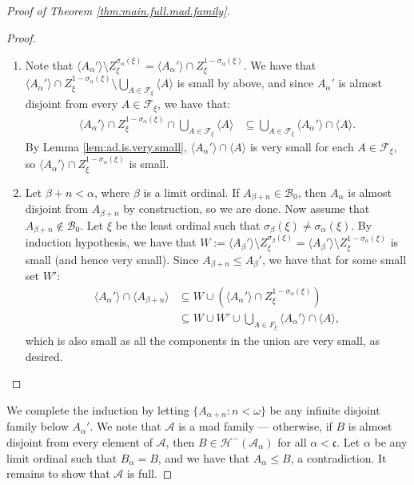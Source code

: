\documentclass[10pt,a4paper]{amsart}
\theoremstyle{plain}
\numberwithin{equation}{section}
\theoremstyle{definition}
\renewcommand{\c}[1]{\langle #1 \rangle}
\newcommand{\F}{\cal{F}}
\newcommand{\cal}{\mathcal}
\renewcommand{\frak}{\mathfrak}
\newcommand{\A}{\cal{A}}
\newcommand{\B}{\cal{B}}
\renewcommand{\H}{\cal{H}}
\newenvironment{midproof}[1][Proof]
  {\begin{proof}[#1]\renewcommand{\qedsymbol}{$\blacksquare$}}
  {\end{proof}}
\begin{document}
\begin{proof}[Proof of Theorem \ref{thm:main.full.mad.family}]
    \begin{midproof}
        \hfill
        \begin{enumerate}
            \item Note that $\c{A_\alpha'} \setminus Z_\xi^{\sigma_\alpha(\xi)} = \c{A_\alpha'} \cap Z_\xi^{1-\sigma_\alpha(\xi)}$. We have that $\c{A_\alpha'} \cap Z_\xi^{1 - \sigma_\alpha(\xi)} \setminus \bigcup_{A \in \F_\xi} \c{A}$ is small by above, and since $A_\alpha'$ is almost disjoint from every $A \in \F_\xi$, we have that:
            \begin{align*}
                \c{A_\alpha'} \cap Z_\xi^{1 - \sigma_\alpha(\xi)} \cap \bigcup_{A \in \F_\xi} \c{A} &\subseteq \bigcup_{A \in \F_\xi} \c{A_\alpha'} \cap \c{A}.
            \end{align*}
            By Lemma \ref{lem:ad.is.very.small}, $\c{A_\alpha'} \cap \c{A}$ is very small for each $A \in \F_\xi$, so $\c{A_\alpha'} \cap Z_\xi^{1-\sigma_\alpha(\xi)}$ is small. 

            \item Let $\beta + n < \alpha$, where $\beta$ is a limit ordinal. If $A_{\beta+n} \in \B_0$, then $A_\alpha$ is almost disjoint from $A_{\beta+n}$ by construction, so we are done. Now assume that $A_{\beta+n} \notin \B_0$. Let $\xi$ be the least ordinal such that $\sigma_\beta(\xi) \neq \sigma_\alpha(\xi)$. By induction hypothesis, we have that $W := \c{A_\beta'} \setminus Z_\xi^{\sigma_\beta(\xi)} = \c{A_\beta'} \setminus Z_\xi^{1-\sigma_\alpha(\xi)}$ is small (and hence very small). Since $A_{\beta+n} \leq A_\beta'$, we have that for some small set $W'$:
            \begin{align*}
                \c{A_\alpha'} \cap \c{A_{\beta+n}} &\subseteq W \cup (\c{A_\alpha'} \cap Z_\xi^{1-\sigma_\alpha(\xi)}) \\
                &\subseteq W \cup W' \cup \bigcup_{A \in F_\xi} \c{A_\alpha'} \cap \c{A},
            \end{align*}
            which is also small as all the components in the union are very small, as desired.
        \end{enumerate}
    \end{midproof}
    We complete the induction by letting $\{A_{\alpha+n} : n < \omega\}$ be any infinite disjoint family below $A_\alpha'$. We note that $\A$ is a mad family --- otherwise, if $B$ is almost disjoint from every element of $\A$, then $B \in \H^-(\A_\alpha)$ for all $\alpha < \frak{c}$. Let $\alpha$ be any limit ordinal such that $B_\alpha = B$, and we have that $A_\alpha \leq B$, a contradiction. It remains to show that $\A$ is full.
    

\end{proof}
\end{document}
